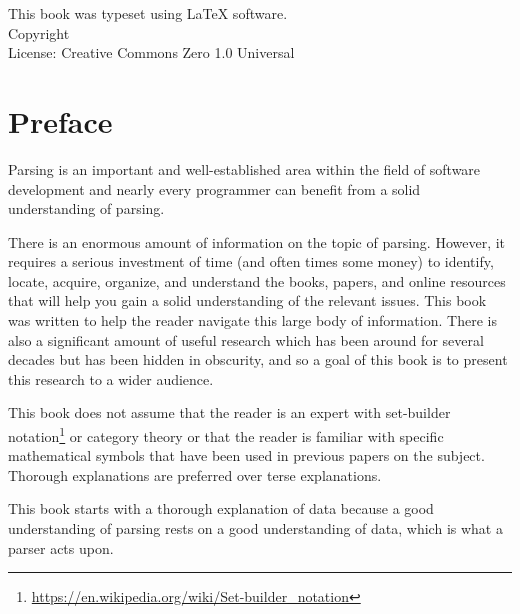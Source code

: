 \documentclass{book}
\makeatletter
\newcommand{\booklicense}{Creative Commons Zero 1.0 Universal}
\newcommand{\bookauthor}{\@author}
\makeatother
\begin{document}
\thispagestyle{empty}

\begin{flushleft}
\vspace*{\fill}
This book was typeset using \LaTeX{} software.\\
\vspace{\fill}
Copyright \textcopyright{} \the\year{}  \bookauthor\\
License: \booklicense
\end{flushleft}

\addtocounter{page}{2}

%
%

\chapter*{Preface}
Parsing is an important and well-established area within the field
of software development and nearly every programmer can benefit 
from a solid understanding of parsing. 

There is an enormous amount of information on the topic of parsing.
However, it requires a serious investment of time 
(and often times some money) to 
identify, locate, acquire, organize, and understand the books, papers, 
and online resources that will help you gain a solid 
understanding of the relevant issues. 
This book was written to help the reader navigate this large body of
information. There is also a significant 
amount of useful research which has been around
for several decades but has been hidden in obscurity, and so
a goal of this book is to present this research to a wider audience.

This book does not assume that the reader is an expert with set-builder 
notation\footnote{\url{https://en.wikipedia.org/wiki/Set-builder_notation}}
or category theory
or that the reader is familiar with specific mathematical symbols
that have been used in previous papers on the subject.
Thorough explanations are preferred over terse explanations.

This book starts with a thorough explanation of data because
a good understanding of parsing rests on a good
understanding of data, which is what a parser acts upon.
\end{document}
